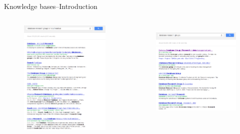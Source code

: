 \documentclass[onlymath,xcolor=pdftex,dvipsnames,table]{beamer}
\begin{document}
\begin{frame}{Knowledge bases--Introduction}
\begin{columns}[c]
  \begin{figure}
    \centering
    \includegraphics[width=\linewidth]{eg1.png}
  \end{figure}
  \begin{figure}
    \centering
    \includegraphics[width=\linewidth]{eg2.png}\\

\end{figure}
\end{columns}
\end{frame}
\end{document}
